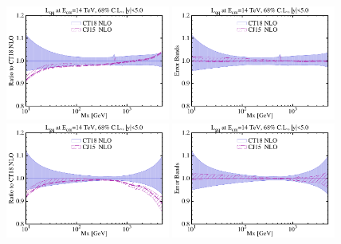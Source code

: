 \begin{figure}[!htbp]
	\begin{center}
		\hspace*{-0.4cm}
		\includegraphics[width=0.48\textwidth]{./fig/Lumi_CT18NLO_CJ15nlo/Lumi_14TeV_ym-lt-5-0_asym_20__68CL-CT18NLO_CJ15nlo__00_qQr_ect.pdf} 
		\includegraphics[width=0.48\textwidth]{./fig/Lumi_CT18NLO_CJ15nlo/Lumi_14TeV_ym-lt-5-0_asym_20__68CL-CT18NLO_CJ15nlo__00_qQ2_ect.pdf} \\
		\includegraphics[width=0.48\textwidth]{./fig/Lumi_CT18NLO_CJ15nlo/Lumi_14TeV_ym-lt-5-0_asym_20__68CL-CT18NLO_CJ15nlo__00_gqr_ect.pdf} 
		\includegraphics[width=0.48\textwidth]{./fig/Lumi_CT18NLO_CJ15nlo/Lumi_14TeV_ym-lt-5-0_asym_20__68CL-CT18NLO_CJ15nlo__00_gq2_ect.pdf} \\

\end{center}
\end{figure}
